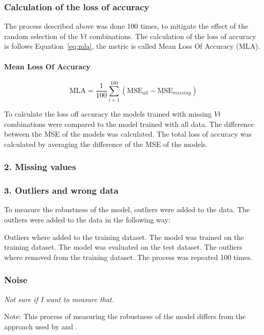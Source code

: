 \subsubsection*{Calculation of the loss of accuracy}
The process described above was done 100 times, to mitigate the effect of the random selection of the $Vt$ combinations. 
The calculation of the loss of accuracy is follows Equation~\ref{eq:mla}, the metric is called Mean Loss Of Accuracy (\ac{MLA}).

\paragraph*{Mean Loss Of Accuracy}
\begin{equation}
    \label{eq:mla}
    \text{MLA} = \frac{1}{100} \sum_{i=1}^{100} \left( \text{MSE}_{all} - \text{MSE}_{missing} \right)
\end{equation}

To calculate the loss off accuracy the models trained with missing $Vt$ combinations were compared to the model trained with all data. 
The difference between the \ac{MSE} of the models was calculated. The total loss of accuracy was calculated by averaging the difference of the \ac{MSE} of the models.

\subsubsection*{2. Missing values}

\subsubsection*{3. Outliers and wrong data}
To measure the robustness of the model, outliers were added to the data. The outliers were added to the data in the following way:

Outliers where added to the training dataset.
The model was trained on the training dataset.
The model was evaluated on the test dataset.
The outliers where removed from the training dataset.
The process was repeated 100 times.

\subsubsection*{Noise}
\textit{Not sure if I want to measure that.}


Note: This process of measuring the robustness of the model differs from the approach used by \cite{siebert_constructionqualitymodel_} and \cite{saez_evaluatingclassifierbehavior_2016}.

